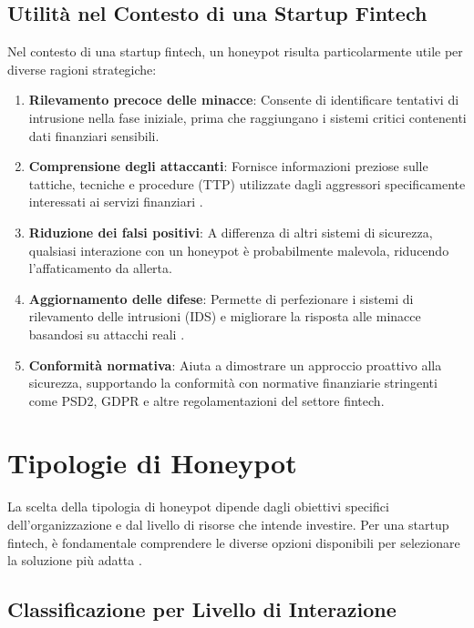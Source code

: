 \documentclass[a4paper,12pt]{report}
\begin{document}
\subsection{Utilità nel Contesto di una Startup Fintech}
\label{subsec:utilita_fintech}

Nel contesto di una startup fintech, un honeypot risulta particolarmente utile per diverse ragioni strategiche:

\begin{enumerate}
    \item \textbf{Rilevamento precoce delle minacce}: Consente di identificare tentativi di intrusione nella fase iniziale, prima che raggiungano i sistemi critici contenenti dati finanziari sensibili.
    \item \textbf{Comprensione degli attaccanti}: Fornisce informazioni preziose sulle tattiche, tecniche e procedure (TTP) utilizzate dagli aggressori specificamente interessati ai servizi finanziari \cite{vito2024}.
    \item \textbf{Riduzione dei falsi positivi}: A differenza di altri sistemi di sicurezza, qualsiasi interazione con un honeypot è probabilmente malevola, riducendo l'affaticamento da allerta.
    \item \textbf{Aggiornamento delle difese}: Permette di perfezionare i sistemi di rilevamento delle intrusioni (IDS) e migliorare la risposta alle minacce basandosi su attacchi reali \cite{fortinet2023}.
    \item \textbf{Conformità normativa}: Aiuta a dimostrare un approccio proattivo alla sicurezza, supportando la conformità con normative finanziarie stringenti come PSD2, GDPR e altre regolamentazioni del settore fintech.
\end{enumerate}

\section{Tipologie di Honeypot}
\label{sec:tipologie}

La scelta della tipologia di honeypot dipende dagli obiettivi specifici dell'organizzazione e dal livello di risorse che intende investire. Per una startup fintech, è fondamentale comprendere le diverse opzioni disponibili per selezionare la soluzione più adatta \cite{perego_2023}.

\subsection{Classificazione per Livello di Interazione}
\label{subsec:class_interazione}
\end{document}
